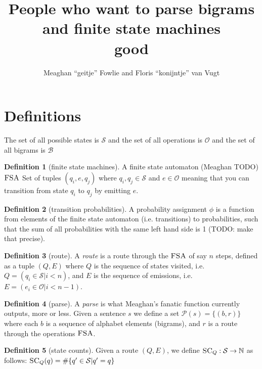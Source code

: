 \documentclass[12pt]{article}
\title{People who want to parse bigrams and finite state machines\\good}
\author{Meaghan ``geitje'' Fowlie and Floris ``konijntje'' van Vugt}
\theoremstyle{definition}
\newtheorem{definition}{Definition}[section]
\begin{document}
\maketitle

\section{Definitions}

\newcommand\STATES{\mathcal{S}}
\newcommand\OPS{\mathcal{O}}
\newcommand\BIGR{\mathcal{B}}
\newcommand\FSA{\textsc{FSA}}
\newcommand\PARSES{\mathcal{P}}
\newcommand\SC{\textsc{SC}}
\newcommand\TC{\textsc{TC}}
\newcommand\N{\mathbb{N}}

The set of all possible states is $\STATES$ and the set of all operations is $\OPS$ and the set of all bigrams is $\BIGR$



\begin{definition}[finite state machines]
  A finite state automaton (Meaghan TODO) $\FSA$
  Set of tuples $(q_i,e,q_j)$ where $q_i,q_j\in\STATES$ and $e\in\OPS$ meaning that you can transition from state $q_i$ to $q_j$ by emitting $e$.
\end{definition}

\begin{definition}[transition probabilities]
  A probability assignment $\phi$ is a function from elements of the finite state automaton (i.e. transitions) to probabilities, such that the sum of all probabilities with the same left hand side is 1 (TODO: make that precise).
\end{definition}


\begin{definition}[route]
  A \emph{route} is a route through the $\FSA$ of say $n$ steps, defined as a tuple $(Q,E)$ where $Q$ is the sequence of states visited, i.e.
  $Q=(q_i\in\STATES|i<n)$, and $E$ is the sequence of emissions, i.e. $E=(e_i\in\OPS|i<n-1)$.
\end{definition}


\begin{definition}[parse]
  A \emph{parse} is what Meaghan's fanatic function currently outputs, more or less.
  Given a sentence $s$ we define a set $\PARSES(s) = \{ (b,r) \}$ where each $b$ is a sequence of alphabet elements (bigrams), and $r$ is a route through the operations $\FSA$.
\end{definition}


\begin{definition}[state counts]
  Given a route $(Q,E)$, we define $\SC_Q : \STATES \rightarrow\N$ as follows: $\SC_Q(q) = \#\{ q'\in \STATES | q'=q \}$
\end{definition}
\end{document}
